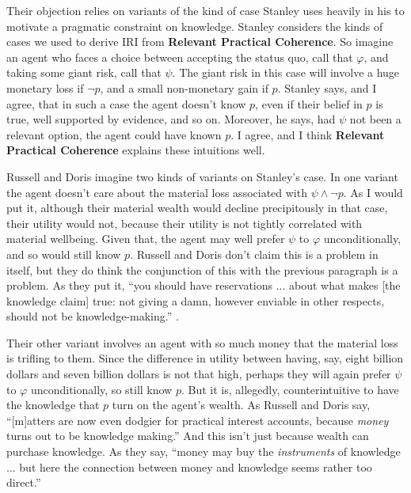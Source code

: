 Their objection relies on variants of the kind of case Stanley uses heavily in his \citeyearpar{Stanley2005-STAKAP} to motivate a pragmatic constraint on knowledge. Stanley considers the kinds of cases we used to derive IRI from \textbf{Relevant Practical Coherence}. So imagine an agent who faces a choice between accepting the status quo, call that $\varphi$, and taking some giant risk, call that $\psi$. The giant risk in this case will involve a huge monetary loss if $\neg p$, and a small non-monetary gain if $p$. Stanley says, and I agree, that in such a case the agent doesn't know $p$, even if their belief in $p$ is true, well supported by evidence, and so on. Moreover, he says, had $\psi$ not been a relevant option, the agent could have known $p$. I agree, and I think \textbf{Relevant Practical Coherence} explains these intuitions well.

Russell and Doris imagine two kinds of variants on Stanley's case. In one variant the agent doesn't care about the material loss associated with $\psi \wedge \neg p$. As I would put it, although their material wealth would decline precipitously in that case, their utility would not, because their utility is not tightly correlated with material wellbeing. Given that, the agent may well prefer $\psi$ to $\varphi$ unconditionally, and so would still know $p$. Russell and Doris don't claim this is a problem in itself, but they do think the conjunction of this with the previous paragraph is a problem. As they put it, ``you should have reservations ... about what makes [the knowledge claim] true: not giving a damn, however enviable in other respects, should not be knowledge-making.'' \citep[432]{RussellDoris2008}. 

Their other variant involves an agent with so much money that the material loss is trifling to them. Since the difference in utility between having, say, eight billion dollars and seven billion dollars is not that high, perhaps they will again prefer $\psi$ to $\varphi$ unconditionally, so still know $p$. But it is, allegedly, counterintuitive to have the knowledge that $p$ turn on the agent's wealth. As Russell and Doris say, ``[m]atters are now even dodgier for practical interest accounts, because \textit{money} turns out to be knowledge making.'' \citep[433]{RussellDoris2008} And this isn't just because wealth can purchase knowledge. As they say, ``money may buy the \textit{instruments} of knowledge ... but here the connection between money and knowledge seems rather too direct.'' \citep[433]{RussellDoris2008}


